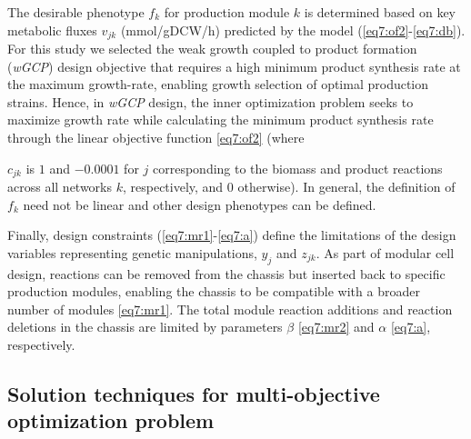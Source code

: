 The desirable phenotype $f_k$ for production module $k$ is determined based on key metabolic fluxes $v_{jk}$ (mmol/gDCW/h) predicted by the model (\ref{eq7:of2}-\ref{eq7:db}).
For this study we selected the weak growth coupled to product formation (\emph{wGCP}) design objective that requires a high minimum product synthesis rate at the maximum growth-rate, enabling growth selection of optimal production strains.
Hence, in \emph{wGCP} design, the inner optimization problem seeks to maximize growth rate while calculating the minimum product synthesis rate through the linear objective function \eqref{eq7:of2} (where {$c_{jk}$ is $1$ and $-0.0001$ for $j$ corresponding to the biomass and product reactions across all networks $k$, respectively, and 0 otherwise).
In general, the definition of $f_k$ need not be linear and other design phenotypes can be defined.\citep{garcia2019}

Finally, design constraints (\ref{eq7:mr1}-\ref{eq7:a}) define the limitations of the design variables representing genetic manipulations, $y_j$ and $z_{jk}$.
As part of modular cell design, reactions can be removed from the chassis but inserted back to specific production modules, enabling the chassis to be compatible with a broader number of modules \eqref{eq7:mr1}.
The total module reaction additions and reaction deletions in the chassis are limited by parameters $\beta$ \eqref{eq7:mr2} and $\alpha$ \eqref{eq7:a}, respectively.%


\subsection{Solution techniques for multi-objective optimization problem}

}
